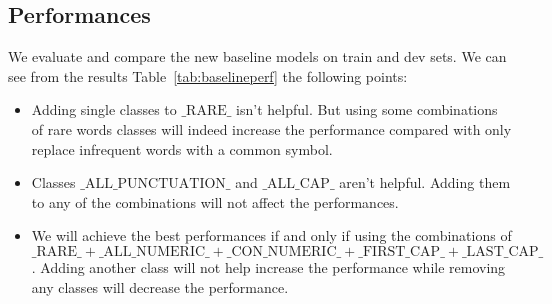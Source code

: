 \subsection{\textbf{Performances}}

We evaluate and compare the new baseline models on train and dev sets. We can see from the results Table~\ref{tab:baselineperf} the following points:

\begin{itemize}
\item Adding single classes to $\text{\_RARE\_}$ isn't helpful. But using some combinations of rare words classes will indeed increase the performance compared with only replace infrequent words with a common symbol.
\item Classes $\text{\_ALL\_PUNCTUATION\_}$ and $\text{\_ALL\_CAP\_}$ aren't helpful. Adding them to any of the combinations will not affect the performances.
\item We will achieve the best performances if and only if using the combinations of $\text{\_RARE\_}+\text{\_ALL\_NUMERIC\_}+\text{\_CON\_NUMERIC\_}+\text{\_FIRST\_CAP\_}+\text{\_LAST\_CAP\_}$. Adding another class will not help increase the performance while removing any classes will decrease the performance.
\end{itemize}

